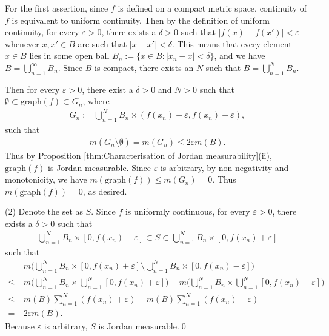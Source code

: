 \documentclass{book}
\theoremstyle{defstyle}
\theoremstyle{thmstyle}
\newcounter{Proposition}[section]
\begin{document}
For the first assertion, since $f$ is defined on a compact metric space, continuity of $f$ is equivalent to uniform continuity. Then by the definition of uniform continuity, for every $\varepsilon > 0$, there exists a $\delta > 0$ such that $|f(x) - f(x')| < \varepsilon$ whenever $x, x' \in B$ are such that $|x - x'| < \delta$. This means that every element $x \in B$ lies in some open ball $B_n := \{x \in B : |x_n - x| < \delta\}$, and we have $B = \bigcup_{n = 1}^{\infty}B_n$. Since $B$ is compact, there exists an $N$ such that $B = \bigcup_{n = 1}^{N}B_n$.

Then for every $\varepsilon > 0$, there exist a $\delta > 0$ and $N > 0$ such that $\emptyset \subset \text{graph}(f) \subset G_n$, where
    \begin{align*}
        G_n := \bigcup_{n = 1}^{N}B_n \times (f(x_n) - \varepsilon, f(x_n) + \varepsilon),
    \end{align*}
such that
    \begin{align*}
        m(G_n \setminus \emptyset)
        = m(G_n)
        \leq 2\varepsilon m(B).
    \end{align*}
Thus by Proposition \ref{thm:Characterisation of Jordan measurability}(ii), $\text{graph}(f)$ is Jordan measurable. Since $\varepsilon$ is arbitrary, by non-negativity and monotonicity, we have $m(\text{graph}(f)) \leq m(G_n) = 0.$ Thus $m(\text{graph}(f)) = 0$, as desired.

(2) Denote the set as $S$. Since $f$ is uniformly continuous, for every $\varepsilon > 0$, there exists a $\delta > 0$ such that
    \begin{align*}
        \bigcup_{n = 1}^{N}B_n \times [0, f(x_n) - \varepsilon]
        \subset S
        \subset \bigcup_{n = 1}^{N}B_n \times [0, f(x_n) + \varepsilon]
    \end{align*}
such that
    \begin{align*}
        &m\Big(\bigcup_{n = 1}^{N}B_n \times [0, f(x_n) + \varepsilon]
            \setminus \bigcup_{n = 1}^{N}B_n \times [0, f(x_n) - \varepsilon]\Big)\\
        \leq\ & m\Big(\bigcup_{n = 1}^{N}B_n \times \bigcup_{n = 1}^{N}[0, f(x_n) + \varepsilon]\Big)
            - m\Big(\bigcup_{n = 1}^{N}B_n \times \bigcup_{n = 1}^{N}[0, f(x_n) - \varepsilon]\Big)\\
        \leq\ & m(B)\sum_{n = 1}^{N}(f(x_n) + \varepsilon) - m(B)\sum_{n = 1}^{N}(f(x_n) - \varepsilon)\\
        =\ & 2\varepsilon m(B).
    \end{align*}
Because $\varepsilon$ is arbitrary, $S$ is Jordan measurable.\qed
\end{document}
